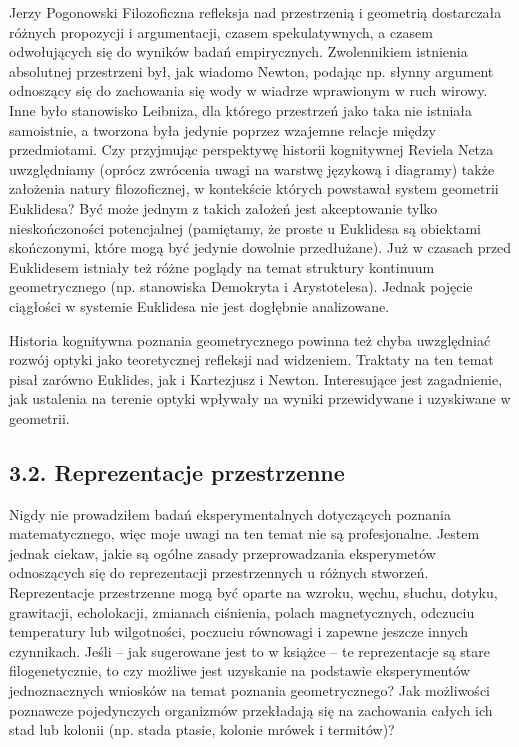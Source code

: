 \begin{newrevengenv}{Jerzy Pogonowski}
Filozoficzna refleksja nad przestrzenią i geometrią dostarczała
różnych propozycji i argumentacji, czasem spekulatywnych, a czasem
odwołujących się do wyników badań empirycznych. Zwolennikiem
istnienia absolutnej przestrzeni był, jak wiadomo Newton, podając
np. słynny argument odnoszący się do zachowania się wody w wiadrze
wprawionym w ruch wirowy. Inne było stanowisko Leibniza, dla
którego przestrzeń jako taka nie istniała samoistnie, a tworzona
była jedynie poprzez wzajemne relacje między przedmiotami. Czy
przyjmując perspektywę historii kognitywnej Reviela Netza
uwzględniamy (oprócz zwrócenia uwagi na warstwę językową i
diagramy) także założenia natury filozoficznej, w kontekście
których powstawał system geometrii Euklidesa? Być może jednym z
takich założeń jest akceptowanie tylko nieskończoności
potencjalnej (pamiętamy, że proste u Euklidesa są obiektami
skończonymi, które mogą być jedynie dowolnie przedłużane). Już w
czasach przed Euklidesem istniały też różne poglądy na temat
struktury kontinuum geometrycznego (np. stanowiska Demokryta i
Arystotelesa). Jednak pojęcie ciągłości w systemie Euklidesa nie
jest dogłębnie analizowane.

Historia kognitywna poznania geometrycznego powinna też chyba
uwzględniać rozwój optyki jako teoretycznej refleksji nad
widzeniem. Traktaty na ten temat pisał zarówno Euklides, jak i
Kartezjusz i Newton. Interesujące jest zagadnienie, jak ustalenia
na terenie optyki wpływały na wyniki przewidywane i uzyskiwane w
geometrii.

\subsection{3.2. Reprezentacje przestrzenne}

Nigdy nie prowadziłem badań eksperymentalnych dotyczących poznania
matematycznego, więc moje uwagi na ten temat nie są profesjonalne.
Jestem jednak ciekaw, jakie są ogólne zasady przeprowadzania
eksperymetów odnoszących się do reprezentacji przestrzennych u
różnych stworzeń. Reprezentacje przestrzenne mogą być oparte na
wzroku, węchu, słuchu, dotyku, grawitacji, echolokacji, zmianach
ciśnienia, polach magnetycznych, odczuciu temperatury lub
wilgotności, poczuciu równowagi i zapewne jeszcze innych
czynnikach. Jeśli -- jak sugerowane jest to w książce -- te
reprezentacje są stare filogenetycznie, to czy możliwe jest
uzyskanie na podstawie eksperymentów jednoznacznych wniosków na
temat poznania geometrycznego? Jak możliwości poznawcze
pojedynczych organizmów przekładają się na zachowania całych ich
stad lub kolonii (np. stada ptasie, kolonie mrówek i termitów)?


\end{newrevengenv}
